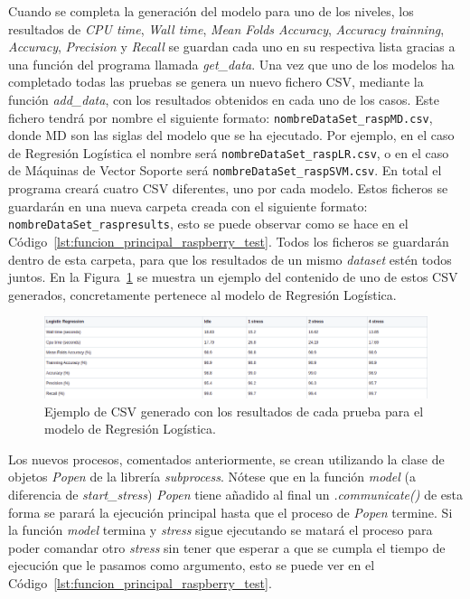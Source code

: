 \documentclass[a4paper, 12pt]{book}
\begin{document}
Cuando se completa la generación del modelo para uno de los niveles, los resultados de \textit{CPU time}, \textit{Wall time}, \textit{Mean Folds Accuracy}, \textit{Accuracy trainning}, \textit{Accuracy}, \textit{Precision} y \textit{Recall} se guardan cada uno en su respectiva lista gracias a una función del programa llamada \textit{get\_data}. Una vez que uno de los modelos ha completado todas las pruebas se genera un nuevo fichero CSV, mediante la función \textit{add\_data}, con los resultados obtenidos en cada uno de los casos.
Este fichero tendrá por nombre el siguiente formato: \texttt{nombreDataSet\_raspMD.csv}, donde MD son las siglas del modelo que se ha ejecutado. Por ejemplo, en el caso de Regresión Logística el nombre será \texttt{nombreDataSet\_raspLR.csv}, o en el caso de Máquinas de Vector Soporte será \texttt{nombreDataSet\_raspSVM.csv}. En total el programa creará cuatro CSV diferentes, uno por cada modelo. Estos ficheros se guardarán en una nueva carpeta creada con el siguiente formato: \texttt{nombreDataSet\_raspresults}, esto se puede observar como se hace en el Código~\ref{lst:funcion_principal_raspberry_test}. Todos los ficheros se guardarán dentro de esta carpeta, para que los resultados de un mismo \textit{dataset} estén todos juntos. En la Figura~\ref{fig:ejemplo_csv} se muestra un ejemplo del contenido de uno de estos CSV generados, concretamente pertenece al modelo de Regresión Logística.

\begin{figure}[htb]
  \centering
  \includegraphics[width=16cm, keepaspectratio]{img/ejemplo_csv.png}
  \caption{Ejemplo de CSV generado con los resultados de cada prueba para el modelo de Regresión Logística.}\label{fig:ejemplo_csv}
\end{figure}

Los nuevos procesos, comentados anteriormente, se crean utilizando la clase de objetos \textit{Popen} de la librería \textit{subprocess}. Nótese que en la función \textit{model} (a diferencia de \textit{start\_stress}) \textit{Popen} tiene añadido al final un \textit{.communicate()} de esta forma se parará la ejecución principal hasta que el proceso de \textit{Popen} termine. Si la función \textit{model} termina y \textit{stress} sigue ejecutando se matará el proceso para poder comandar otro \textit{stress} sin tener que esperar a que se cumpla el tiempo de ejecución que le pasamos como argumento, esto se puede ver en el Código~\ref{lst:funcion_principal_raspberry_test}.
\end{document}
